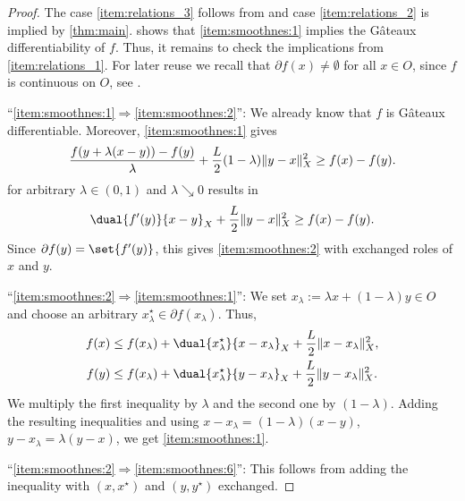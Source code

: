 \documentclass[
	english
]{scrartcl}
\numberwithin{equation}{section} %
\let\cite\parencite
\DeclarePairedDelimiter\norm{\lVert}{\rVert}
\newcommand{\dualspace}{^\star}
\begin{document}
\begin{proof}
	The case \ref{item:relations_3}
	follows from
	\cite[Corollary~3.5.7 and Remark~3.5.2]{Zalinescu2002}
	and case \ref{item:relations_2}
	is implied by \cref{thm:main}.
	shows that
	\ref{item:smoothnes:1}
	implies the Gâteaux differentiability of $f$.
	Thus, it remains to check the implications from \ref{item:relations_1}.
	For later reuse we recall that $\partial f(x) \ne \emptyset$
	for all $x \in O$,
	since $f$ is continuous on $O$,
	see \cite[Theorems~2.2.20 and 2.4.9]{Zalinescu2002}.

	``\ref{item:smoothnes:1}$\Rightarrow$\ref{item:smoothnes:2}'':
	We already know that $f$ is Gâteaux differentiable.
	Moreover, \ref{item:smoothnes:1} gives
	\begin{equation*}
		\frac{f(y + \lambda (x - y)) - f(y)}{\lambda}
		+
		\frac L2 (1- \lambda) \norm{y - x}_X^2
		\ge
		f(x) - f(y).
	\end{equation*}
	for arbitrary $\lambda \in (0,1)$
	and $\lambda \searrow 0$ results in
	\begin{equation*}
		\dual{f'(y)}{x - y}_X
		+
		\frac L2 \norm{y - x}_X^2
		\ge
		f(x) - f(y).
	\end{equation*}
	Since $\partial f(y) = \set{f'(y)}$,
	this gives
	\ref{item:smoothnes:2}
	with exchanged roles of $x$ and $y$.

	``\ref{item:smoothnes:2}$\Rightarrow$\ref{item:smoothnes:1}'':
	We set $x_\lambda := \lambda x + (1-\lambda) y \in O$
	and choose an arbitrary
	$x_\lambda\dualspace \in \partial f(x_\lambda)$.
	Thus,
	\[
		\begin{aligned}
			f( x ) &\le f(x_\lambda) + \dual{x_\lambda\dualspace}{x - x_\lambda}_X + \frac L2 \norm{x - x_\lambda}_X^2, \\
			f( y ) &\le f(x_\lambda) + \dual{x_\lambda\dualspace}{y - x_\lambda}_X + \frac L2 \norm{y - x_\lambda}_X^2.
		\end{aligned}
	\]
	We multiply the first inequality by $\lambda$
	and the second one by $(1-\lambda)$.
	Adding the resulting inequalities
	and using
	$x - x_\lambda = (1-\lambda) (x - y)$, $y - x_\lambda = \lambda (y - x)$,
	we get
	\ref{item:smoothnes:1}.

	``\ref{item:smoothnes:2}$\Rightarrow$\ref{item:smoothnes:6}'':
	This follows from adding the inequality
	with $(x,x\dualspace)$ and $(y,y\dualspace)$ exchanged.


\end{proof}
\end{document}
